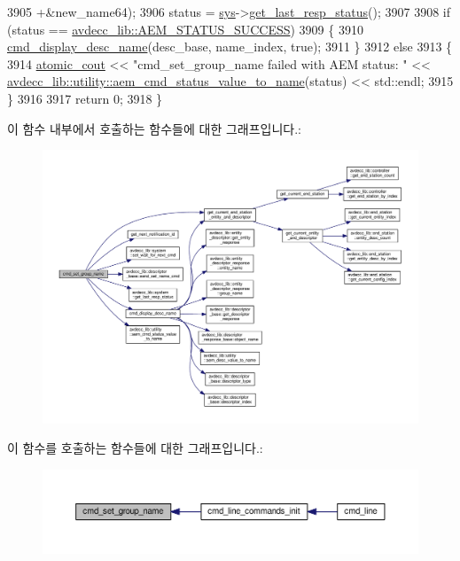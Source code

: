 \begin{DoxyCode}
3905                                  +&new\_name64);
3906     status = \hyperlink{classcmd__line_a485db4800e331cb4052c447fdf5d154e}{sys}->\hyperlink{classavdecc__lib_1_1system_aa63e8d1a4e51f695cdcccc9340922407}{get\_last\_resp\_status}();
3907 
3908     \textcolor{keywordflow}{if} (status == \hyperlink{namespaceavdecc__lib_affd436edb2cecd20cfd784a84f852b2bac947077909cb590b84f4b5db413080e0}{avdecc\_lib::AEM\_STATUS\_SUCCESS})
3909     \{
3910         \hyperlink{classcmd__line_a86dc6edfca6ae559b482840c706f7a1a}{cmd\_display\_desc\_name}(desc\_base, name\_index, \textcolor{keyword}{true});
3911     \}
3912     \textcolor{keywordflow}{else}
3913     \{
3914         \hyperlink{cmd__line_8h_a0bc38ccc65c79ba06c6fcd7b4bf554c3}{atomic\_cout} << \textcolor{stringliteral}{"cmd\_set\_group\_name failed with AEM status: "} << 
      \hyperlink{namespaceavdecc__lib_1_1utility_aca66a547b66fdb27f3221ad0844d60c6}{avdecc\_lib::utility::aem\_cmd\_status\_value\_to\_name}(status) 
      << std::endl;
3915     \}
3916 
3917     \textcolor{keywordflow}{return} 0;
3918 \}
\end{DoxyCode}


이 함수 내부에서 호출하는 함수들에 대한 그래프입니다.\+:
\nopagebreak
\begin{figure}[H]
\begin{center}
\leavevmode
\includegraphics[width=350pt]{classcmd__line_af7858348fd722d4f184031bcbdc3fed3_cgraph}
\end{center}
\end{figure}




이 함수를 호출하는 함수들에 대한 그래프입니다.\+:
\nopagebreak
\begin{figure}[H]
\begin{center}
\leavevmode
\includegraphics[width=350pt]{classcmd__line_af7858348fd722d4f184031bcbdc3fed3_icgraph}
\end{center}
\end{figure}


